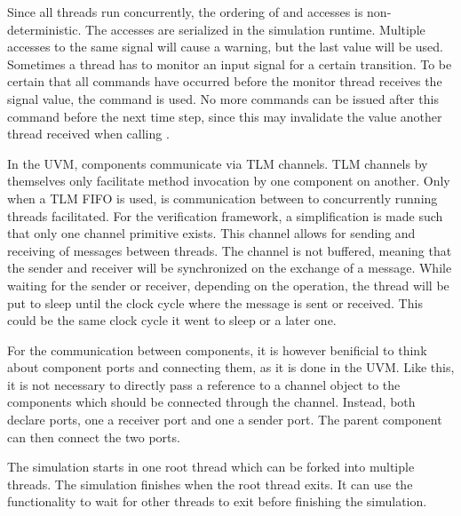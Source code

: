 Since all threads run concurrently, the ordering of  and  accesses is non-deterministic. The
accesses are serialized in the simulation runtime. Multiple  accesses to the same signal will cause a
warning, but the last value will be used. Sometimes a thread has to monitor an input signal for a certain transition.
To be certain that all  commands have occurred before the monitor thread receives the signal value, the
 command is used. No more  commands can be issued after this command before the next time
step, since this may invalidate the value another thread received when calling .

In the UVM, components communicate via TLM channels. TLM channels by themselves only facilitate method invocation by
one component on another. Only when a TLM FIFO is used, is communication between to concurrently running threads
facilitated. For the verification framework, a simplification is made such that only one channel primitive exists. This
channel allows for sending and receiving of messages between threads. The channel is not buffered, meaning that the
sender and receiver will be synchronized
on the exchange of a message. While waiting for the sender or receiver, depending on the operation, the thread will
be put to sleep until the clock cycle where the message is sent or received. This could be the same clock cycle it
went to sleep or a later one.

For the communication between components, it is however benificial to think about component ports and connecting
them, as it is done in the UVM. Like this, it is not necessary to directly pass a reference to a channel object to
the components which should be connected through the channel. Instead, both declare ports, one a receiver port and
one a sender port. The parent component can then connect the two ports.

The simulation starts in one root thread which can be forked into multiple threads. The simulation finishes when the
root thread exits. It can use the  functionality to wait for other threads to exit before finishing the simulation.



